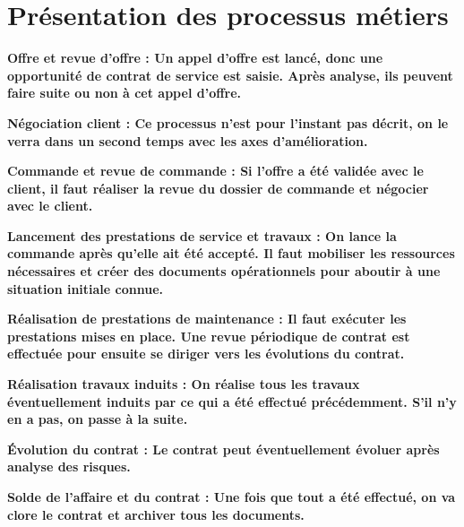 \section{Présentation des processus métiers}

\begin{description}
\item \bf{Offre et revue d'offre} : Un appel d'offre est lancé, donc une opportunité de contrat de service est saisie. Après analyse, ils peuvent faire suite ou non à cet appel d'offre. \\

\item \bf{Négociation client} : Ce processus n'est pour l'instant pas décrit, on le verra dans un second temps avec les axes d'amélioration. \\

\item \bf{Commande et revue de commande} : Si l'offre a été validée avec le client, il faut réaliser la revue du dossier de commande et négocier avec le client. \\

\item \bf{Lancement des prestations de service et travaux} : On lance la commande après qu'elle ait été accepté. Il faut mobiliser les ressources nécessaires et créer des documents opérationnels pour aboutir à une situation initiale connue. \\

\item \bf{Réalisation de prestations de maintenance} : Il faut exécuter les prestations mises en place. Une revue périodique de contrat est effectuée pour ensuite se diriger vers les évolutions du contrat. \\

\item \bf{Réalisation travaux induits} : On réalise tous les travaux éventuellement induits par ce qui a été effectué précédemment. S'il n'y en a pas, on passe à la suite. \\

\item \bf{\'Evolution du contrat} : Le contrat peut éventuellement évoluer après analyse des risques. \\

\item \bf{Solde de l'affaire et du contrat} : Une fois que tout a été effectué, on va clore le contrat et archiver tous les documents.
\end{description}

